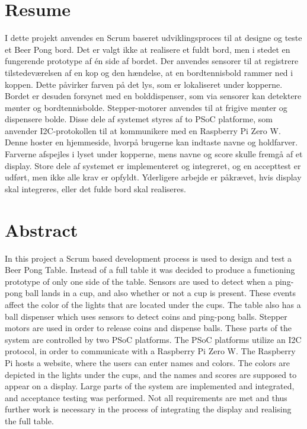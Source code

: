 \documentclass[Rapport/Rapport_main.tex]{subfiles}
\begin{document}
\section{Resume}
I dette projekt anvendes en Scrum baseret udviklingsproces til at designe og teste et Beer Pong bord. Det er valgt ikke at realisere et fuldt bord, men i stedet en fungerende prototype af én side af bordet. Der anvendes sensorer til at registrere tilstedeværelsen af en kop og den hændelse, at en bordtennisbold rammer ned i koppen. Dette påvirker farven på det lys, som er lokaliseret under kopperne. Bordet er desuden forsynet med en bolddispenser, som via sensorer kan detektere mønter og bordtennisbolde. Stepper-motorer anvendes til at frigive mønter og dispensere bolde. Disse dele af systemet styres af to PSoC platforme, som anvender I2C-protokollen til at kommunikere med en Raspberry Pi Zero W. Denne hoster en hjemmeside, hvorpå brugerne kan indtaste navne og holdfarver. Farverne afspejles i lyset under kopperne, mens navne og score skulle fremgå af et display. Store dele af systemet er implementeret og integreret, og en accepttest er udført, men ikke alle krav er opfyldt. Yderligere arbejde er påkrævet, hvis display skal integreres, eller det fulde bord skal realiseres.

\section{Abstract}
In this project a Scrum based development process is used to design and test a Beer Pong Table. Instead of a full table it was decided to produce a functioning prototype of only one side of the table. Sensors are used to detect when a ping-pong ball lands in a cup, and also whether or not a cup is present. These events affect the color of the lights that are located under the cups. The table also has a ball dispenser which uses sensors to detect coins and ping-pong balls. Stepper motors are used in order to release coins and dispense balls. These parts of the system are controlled by two PSoC platforms. The PSoC platforms utilize an I2C protocol, in order to communicate with a Raspberry Pi Zero W. The Raspberry Pi hosts a website, where the users can enter names and colors. The colors are depicted in the lights under the cups, and the names and scores are supposed to appear on a display. Large parts of the system are implemented and integrated, and acceptance testing was performed. Not all requirements are met and thus further work is necessary in the process of integrating the display and realising the full table. 
\end{document}
